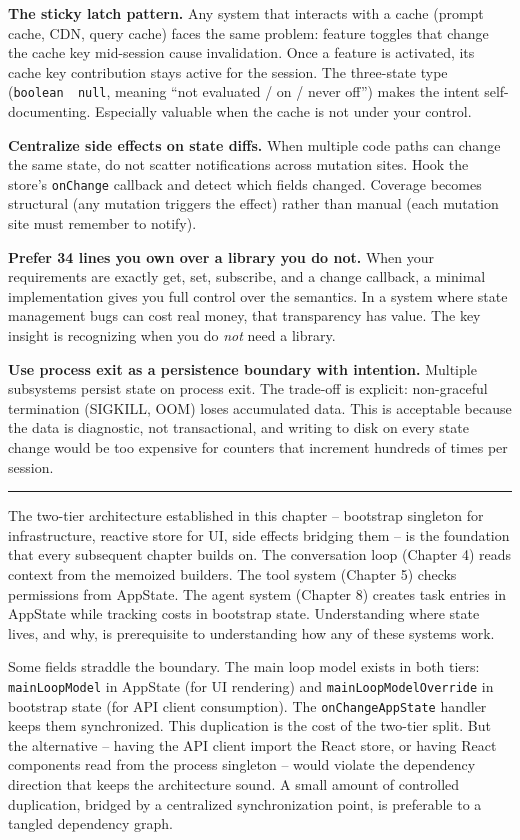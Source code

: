 \documentclass[
  english,
  11pt,
  letterpaper,
]{book}
\begin{document}
\textbf{The sticky latch pattern.} Any system that interacts with a
cache (prompt cache, CDN, query cache) faces the same problem: feature
toggles that change the cache key mid-session cause invalidation. Once a
feature is activated, its cache key contribution stays active for the
session. The three-state type (\texttt{boolean\ \textbar{}\ null},
meaning ``not evaluated / on / never off'') makes the intent
self-documenting. Especially valuable when the cache is not under your
control.

\textbf{Centralize side effects on state diffs.} When multiple code
paths can change the same state, do not scatter notifications across
mutation sites. Hook the store's \texttt{onChange} callback and detect
which fields changed. Coverage becomes structural (any mutation triggers
the effect) rather than manual (each mutation site must remember to
notify).

\textbf{Prefer 34 lines you own over a library you do not.} When your
requirements are exactly get, set, subscribe, and a change callback, a
minimal implementation gives you full control over the semantics. In a
system where state management bugs can cost real money, that
transparency has value. The key insight is recognizing when you do
\emph{not} need a library.

\textbf{Use process exit as a persistence boundary with intention.}
Multiple subsystems persist state on process exit. The trade-off is
explicit: non-graceful termination (SIGKILL, OOM) loses accumulated
data. This is acceptable because the data is diagnostic, not
transactional, and writing to disk on every state change would be too
expensive for counters that increment hundreds of times per session.

\begin{center}\rule{0.5\linewidth}{0.5pt}\end{center}

The two-tier architecture established in this chapter -- bootstrap
singleton for infrastructure, reactive store for UI, side effects
bridging them -- is the foundation that every subsequent chapter builds
on. The conversation loop (Chapter 4) reads context from the memoized
builders. The tool system (Chapter 5) checks permissions from AppState.
The agent system (Chapter 8) creates task entries in AppState while
tracking costs in bootstrap state. Understanding where state lives, and
why, is prerequisite to understanding how any of these systems work.

Some fields straddle the boundary. The main loop model exists in both
tiers: \texttt{mainLoopModel} in AppState (for UI rendering) and
\texttt{mainLoopModelOverride} in bootstrap state (for API client
consumption). The \texttt{onChangeAppState} handler keeps them
synchronized. This duplication is the cost of the two-tier split. But
the alternative -- having the API client import the React store, or
having React components read from the process singleton -- would violate
the dependency direction that keeps the architecture sound. A small
amount of controlled duplication, bridged by a centralized
synchronization point, is preferable to a tangled dependency graph.
\end{document}
